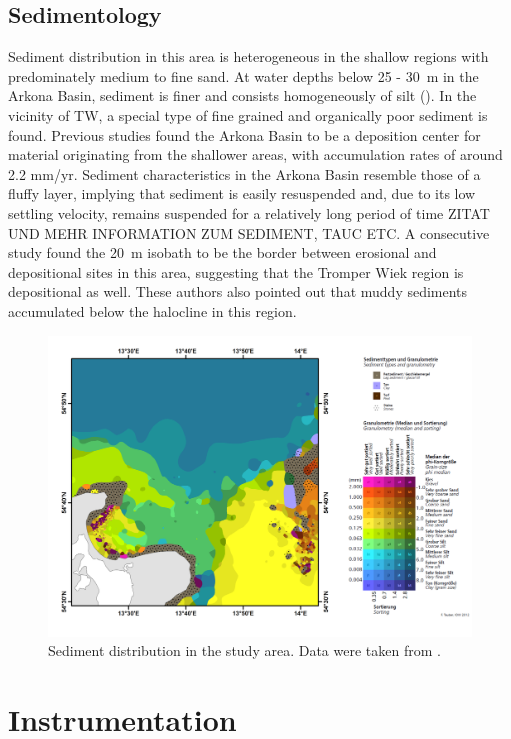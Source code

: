  \FloatBarrier
\subsection{Sedimentology}\label{sedmol}

  Sediment distribution in this area is heterogeneous in the shallow regions 
with predominately medium to fine sand. At water depths below 25 - 30~m in the 
Arkona Basin, sediment is finer and consists homogeneously of silt 
(). In the vicinity of TW, a special type of fine grained and 
organically poor sediment is found. Previous studies \citep[][]{leipe2000, 
basys1} found the Arkona Basin to be a deposition center for material 
originating from the shallower areas, with accumulation rates of around 2.2 
mm/yr. Sediment characteristics in the Arkona Basin resemble those of a 
fluffy layer, implying that sediment is easily resuspended and, due to its low 
settling 
velocity, remains suspended for a relatively long period of time ZITAT UND 
MEHR INFORMATION ZUM SEDIMENT, TAUC ETC. A consecutive 
study \citep[][]{basys2} found the 20~m isobath to be the border between 
erosional and depositional sites in this area, suggesting that the Tromper Wiek 
region is depositional as well. These authors also pointed out that muddy 
sediments accumulated below the halocline in this region.
 \begin{figure}[ht]
\includegraphics[width=30pc]{bilder/TW.pdf}
 \caption{Sediment distribution in the study area. Data were taken from 
\cite{tauber2012}.}
 \label{tauberkarte}
 \end{figure}

\section{Instrumentation}

